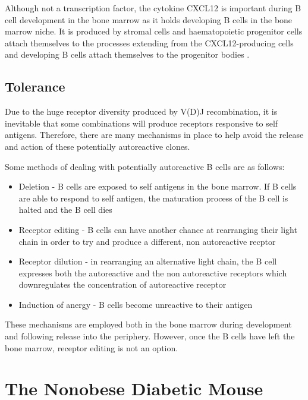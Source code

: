 Although not a transcription factor, the cytokine CXCL12 is important during B cell development in the bone marrow as it holds developing B cells in the bone marrow niche.
It is produced by stromal cells and haematopoietic progenitor cells attach themselves to the processes extending from the CXCL12-producing cells and developing B cells attach themselves to the progenitor bodies \citep{Tokoyoda2004}.

\subsection{Tolerance}

Due to the huge receptor diversity produced by V(D)J recombination, it is inevitable that some combinations will produce receptors responsive to self antigens.
Therefore, there are many mechanisms in place to help avoid the release and action of these potentially autoreactive clones.

Some methods of dealing with potentially autoreactive B cells are as follows:
\begin{itemize}
\item Deletion - B cells are exposed to self antigens in the bone marrow. If B cells are able to respond to self antigen, the maturation process of the B cell is halted and the B cell dies \citep{Cornall1995}
\item Receptor editing - B cells can have another chance at rearranging their light chain in order to try and produce a different, non autoreactive recptor \citep{Orduno2009, Gay1993}
\item Receptor dilution - in rearranging an alternative light chain, the B cell expresses both the autoreactive and the non autoreactive receptors which downregulates the concentration of autoreactive receptor \citep{Gay1993, Orduno2009}
\item Induction of anergy - B cells become unreactive to their antigen \citep{Orduno2009}
\end{itemize}

These mechanisms are employed both in the bone marrow during development and following release into the periphery.
However, once the B cells have left the bone marrow, receptor editing is not an option.



\section{The Nonobese Diabetic Mouse}


